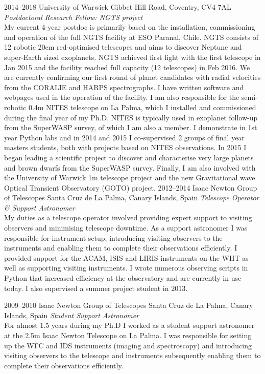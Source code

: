 \documentclass[print]{friggeri-cv} %
\begin{document}
\begin{entrylist}
\entry
{2014--2018}
{University of Warwick}
{Gibbet Hill Road, Coventry, CV4 7AL}
{\emph{Postdoctoral Research Fellow: NGTS project}\\
My current 4-year postdoc is primarily based on the installation, commissioning and operation of the full NGTS facility at ESO Paranal, Chile. NGTS consists of 12 robotic 20cm red-optimised telescopes and aims to discover Neptune and super-Earth sized exoplanets. NGTS achieved first light with the first telescope in Jan 2015 and the facility reached full capacity (12 telescopes) in Feb 2016. We are currently confirming our first round of planet candidates with radial velocities from the CORALIE and HARPS spectrographs. I have written software and webpages used in the operation of the facility. I am also responsible for the semi-robotic 0.4m NITES telescope on La Palma, which I installed and commissioned during the final year of my Ph.D. NITES is typically used in exoplanet follow-up from the SuperWASP survey, of which I am also a member. I demonstrate in 1st year Python labs and in 2014 and 2015 I co-supervised 2 groups of final year masters students, both with projects based on NITES observations. In 2015 I began leading a scientific project to discover and characterise very large planets and brown dwarfs from the SuperWASP survey. Finally, I am also involved with the University of Warwick 1m telescope project and the new Gravitational wave Optical Transient Observatory (GOTO) project. } 
\entry
{2012--2014}
{Isaac Newton Group of Telescopes}
{Santa Cruz de La Palma, Canary Islands, Spain}
{\emph{Telescope Operator \& Support Astronomer}\\
My duties as a telescope operator involved providing expert support to visiting observers and minimising telescope downtime. As a support astronomer I was responsible for instrument setup, introducing visiting observers to the instruments and enabling them to complete their observations efficiently. I provided support for the ACAM, ISIS and LIRIS instruments on the WHT as well as supporting visiting instruments. I wrote numerous observing scripts in Python that increased efficiency at the observatory and are currently in use today. I also supervised a summer project student in 2013.
} 
\end{entrylist}
\begin{entrylist}
\entry
{2009--2010}
{Isaac Newton Group of Telescopes}
{Santa Cruz de La Palma, Canary Islands, Spain}
{\emph{Student Support Astronomer} \\
For almost 1.5 years during my Ph.D I worked as a student support astronomer at the 2.5m Isaac Newton Telescope on La Palma. I was responsible for setting up the WFC and IDS instruments (imaging and spectroscopy) and introducing visiting observers to the telescope and instruments subsequently enabling them to complete their observations efficiently.}
\end{entrylist}
\end{document}
